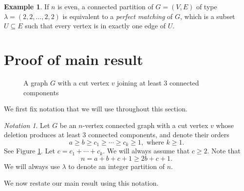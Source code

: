 \documentclass[12pt]{amsart}  %
\theoremstyle{definition}
\newtheorem{example}[theorem]{Example}
\theoremstyle{remark}
\newtheorem{notation}[theorem]{Notation}
\numberwithin{equation}{section}
\begin{document}
\begin{example}
If $n$ is even, a connected partition of $G=(V,E)$ of type $\lambda=(2,2,\ldots,2,2)$ is equivalent to a \emph{perfect matching} of $G$, which is a subset $U\subseteq E$ such that every vertex is in exactly one edge of $U$.
\end{example}

\section{Proof of main result}\label{section:main}

\begin{figure}\caption{\label{fig:graphG} A graph $G$ with a cut vertex $v$ joining at least $3$ connected components}
\vspace{5pt}
\end{figure}

We first fix notation that we will use throughout this section.

\begin{notation}\label{notation}
Let $G$ be an $n$-vertex connected graph with a cut vertex $v$ whose deletion produces at least $3$ connected components, and denote their orders
\begin{equation*}
a\geq b\geq c_1\geq\cdots\geq c_k\geq 1,\text{ where }k\geq 1.
\end{equation*} See Figure \ref{fig:graphG}. Let $c=c_1+\cdots+c_k$. We will always assume that $c\geq 2$. Note that
\begin{equation*}
n=a+b+c+1\geq 2b+c+1.
\end{equation*}
We will always use $\lambda$ to denote an integer partition of $n$. 
\end{notation}
We now restate our main result using this notation.
\end{document}
